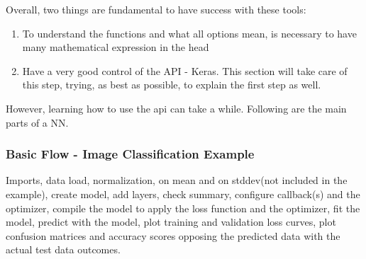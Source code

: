 Overall, two things are fundamental to have success with these tools: 
\begin{enumerate}
    \item To understand the functions and what all options mean, is necessary to have many mathematical expression in the head
    \item Have a very good control of the API - Keras. This section will take care of this step, trying, as best as possible, to explain the first step as well.
\end{enumerate}

However, learning how to use the api can take a while. Following are the main parts of a NN.

\subsubsection{Basic Flow - Image Classification Example}

Imports, data load, normalization, on mean and on stddev(not included in the example), create model, add layers, check summary, configure callback(s) and the optimizer, compile the model to apply the loss function and the optimizer, fit the model, predict with the model, plot training and validation loss curves, plot confusion matrices and accuracy scores opposing the predicted data with the actual test data outcomes.

